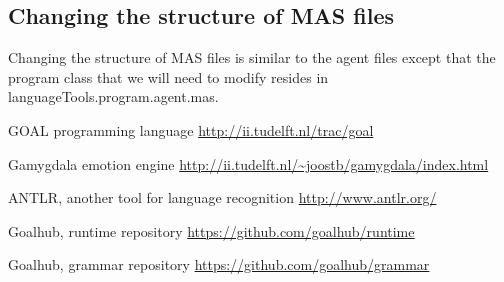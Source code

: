 \documentclass[]{article}
\begin{document}
\subsection{Changing the structure of MAS files}
Changing the structure of MAS files is similar to the agent files except that the program class that we will need to modify resides in languageTools.program.agent.mas.

\clearpage
\printglossaries

\begin{thebibliography}{9}
	
	GOAL programming language
	\url{http://ii.tudelft.nl/trac/goal}
	
	Gamygdala emotion engine
	\url{http://ii.tudelft.nl/~joostb/gamygdala/index.html}
	
	ANTLR, another tool for language recognition
	\url{http://www.antlr.org/}
	
	Goalhub, runtime repository
	\url{https://github.com/goalhub/runtime}
	
	Goalhub, grammar repository
	\url{https://github.com/goalhub/grammar}
		
	
	
\end{thebibliography}
\end{document}
